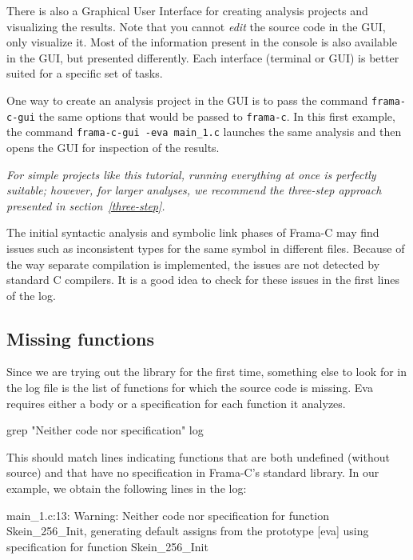 \documentclass[web]{frama-c-book}
\makeatletter
\newenvironment{important}%
{\hspace{5pt plus \linewidth minus \marginparsep}%
 \begin{lrbox}{\@tempboxa}%
   \begin{minipage}{\linewidth - 2\fboxsep}\itshape}
{\end{minipage}\end{lrbox}\colorbox{gris}{\usebox{\@tempboxa}}}
\newcommand{\Eva}{\textsf{Eva}}
\makeatother
\begin{document}
There is also a Graphical User Interface 
for creating analysis projects and
visualizing the results. 
Note that you cannot {\em edit} the source code in the GUI, only visualize it.
Most of the information present in the console is also available in the GUI,
but presented differently. Each interface (terminal or GUI) is better suited
for a specific set of tasks.

One way to create an analysis project in the GUI
is to pass the command \lstinline|frama-c-gui| the same options
that would be passed to \lstinline|frama-c|. In this first example,
the command \lstinline|frama-c-gui -eva main_1.c| launches
the same analysis and then opens the GUI for inspection of the results.

\begin{important}
  For simple projects like this tutorial, running everything at once
  is perfectly suitable; however, for larger analyses, we recommend the
  three-step approach presented in section~\ref{three-step}.
\end{important}

The initial syntactic analysis and symbolic link phases
of Frama-C may find issues such as
inconsistent types for the same symbol in different files.
Because of the way separate compilation is implemented,
the issues are not detected by standard C compilers.
It is a good idea to check for these issues in the first
lines of the log.

\subsection{Missing functions}

Since we are trying out the library for the first time, 
something else to look for in the log file is the list of functions for
which the source code is missing. \Eva{} requires
either a body or a specification for each function it analyzes.

\begin{listing-nonumber}
grep "Neither code nor specification" log
\end{listing-nonumber}

This should match lines indicating functions that are both undefined
(without source) and that have no specification in Frama-C's standard library.
In our example, we obtain the following lines in the log:

\begin{logs}
 main_1.c:13: Warning: 
  Neither code nor specification for function Skein_256_Init,
  generating default assigns from the prototype
[eva] using specification for function Skein_256_Init
\end{logs}
\end{document}
